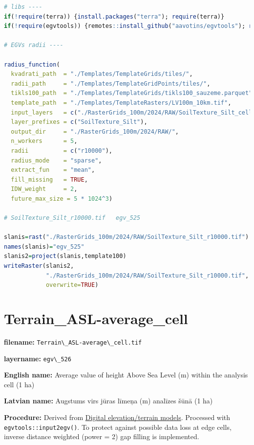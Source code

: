 \documentclass[
]{book}
\newcommand{\passthrough}[1]{#1}
\begin{document}
\begin{lstlisting}[language=R]
# libs ----
if(!require(terra)) {install.packages("terra"); require(terra)}
if(!require(egvtools)) {remotes::install_github("aavotins/egvtools"); require(egvtools)}

# EGVs radii ----

radius_function(
  kvadrati_path  = "./Templates/TemplateGrids/tiles/",
  radii_path     = "./Templates/TemplateGridPoints/tiles/",
  tikls100_path  = "./Templates/TemplateGrids/tikls100_sauzeme.parquet",
  template_path  = "./Templates/TemplateRasters/LV100m_10km.tif",
  input_layers   = c("./RasterGrids_100m/2024/RAW/SoilTexture_Silt_cell.tif"),
  layer_prefixes = c("SoilTexture_Silt"),
  output_dir     = "./RasterGrids_100m/2024/RAW/",
  n_workers      = 5,
  radii          = c("r10000"),
  radius_mode    = "sparse",
  extract_fun    = "mean",
  fill_missing   = TRUE,
  IDW_weight     = 2,
  future_max_size = 5 * 1024^3)

# SoilTexture_Silt_r10000.tif   egv_525

slanis=rast("./RasterGrids_100m/2024/RAW/SoilTexture_Silt_r10000.tif")
names(slanis)="egv_525"
slanis2=project(slanis,template100)
writeRaster(slanis2,
            "./RasterGrids_100m/2024/RAW/SoilTexture_Silt_r10000.tif",
            overwrite=TRUE)
\end{lstlisting}

\section{Terrain\_ASL-average\_cell}\label{ch06.526}

\textbf{filename:} \passthrough{\lstinline!Terrain\_ASL-average\_cell.tif!}

\textbf{layername:} \passthrough{\lstinline!egv\_526!}

\textbf{English name:} Average value of height Above Sea Level (m) within the analysis cell (1 ha)

\textbf{Latvian name:} Augstums virs jūras līmeņa (m) analīzes šūnā (1 ha)

\textbf{Procedure:} Derived from \hyperref[Ch04.15]{Digital elevation/terrain models}. Processed
with \passthrough{\lstinline!egvtools::input2egv()!}. To protect against
possible data loss at edge cells, inverse distance weighted (power = 2) gap filling
is implemented.
\end{document}
